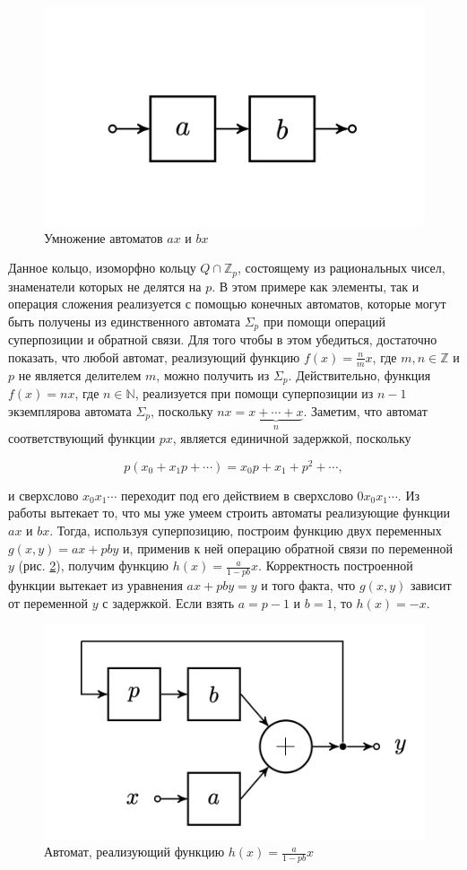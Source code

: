 \documentclass[och, master]{SCWorks}
\theoremstyle{plain}
\theoremstyle{plain}
\theoremstyle{plain}
\theoremstyle{definition}
\begin{document}
\begin{figure}[H]
\centerline{\includegraphics[width=0.5\linewidth]{img/automata_4}}
\caption{Умножение автоматов $ax$ и $bx$}
\label{img:automata:4}
\end{figure}

\noindent Данное кольцо, изоморфно кольцу $Q \cap \mathbb Z_p$, состоящему из рациональных чисел, знаменатели которых не делятся на $p$. В этом примере как элементы, так и операция сложения реализуется с помощью конечных автоматов, которые могут быть получены из единственного автомата $\Sigma_p$ при помощи операций суперпозиции и обратной связи. Для того чтобы в этом убедиться, достаточно показать, что любой автомат, реализующий функцию $f(x)=\frac{n}{m}x$, где $m, n \in \mathbb Z$ и $p$ не является делителем $m$, можно получить из $\Sigma_p$. Действительно, функция $f(x)=nx$, где $n \in \mathbb N$, реализуется при помощи суперпозиции из $n-1$ экземплярова автомата $\Sigma_p$, поскольку $nx=\underbrace{x+\cdots+x}_{n}$. Заметим, что автомат соответствующий функции $px$, является единичной задержкой, поскольку

$$ p(x_0+x_1p+\cdots)=x_0p+x_1+p^2+\cdots, $$

\noindent и сверхслово $x_0x_1\cdots$ переходит под его действием в сверхслово $0x_0x_1\cdots$. Из работы \cite{bib:automata:lunz} вытекает то, что мы уже умеем строить автоматы реализующие функции $ax$ и $bx$. Тогда, используя суперпозицию, построим функцию двух переменных $g(x,y)=ax+pby$ и, применив к ней операцию обратной связи по переменной $y$ (рис. \ref{img:automata:5}), получим функцию $h(x)=\frac{a}{1-pb}x$. Корректность построенной функции вытекает из уравнения $ax+pby=y$ и того факта, что $g(x,y)$ зависит от переменной $y$ с задержкой. Если взять $a=p-1$ и $b=1$, то $h(x)=-x$. 

\begin{figure}[H]
\centerline{\includegraphics[width=0.5\linewidth]{img/automata_5}}
\caption{Автомат, реализующий функцию $h(x)=\frac{a}{1-pb}x$}
\label{img:automata:5}
\end{figure}
\end{document}
